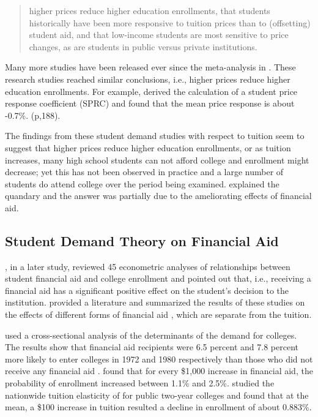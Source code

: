 \documentclass[12pt,english]{report}
\begin{document}
\blockquote{higher prices reduce higher education enrollments, that students historically have been more responsive to tuition prices than to (offsetting) student aid, and that low-income students are most sensitive to price changes, as are students in public versus private institutions.}

Many more studies have been released ever since the meta-analysis in \citep{Leslie1987}. These research 
studies reached similar conclusions, i.e., higher prices reduce higher education enrollments.  For example, \citet{Leslie1987} derived the calculation of a student price response coefficient (SPRC) and 
found that the mean price response is about -0.7\%.   (p,188).

The findings from these student demand studies with respect to tuition seem to suggest that higher prices reduce higher education enrollments, or as tuition increases, many high school students can not afford college and enrollment might decrease; yet this has not been observed in practice and a large number of students do attend college over the period being examined. \citet{Leslie1987} explained the quandary and the answer was partially due to the ameliorating effects of financial aid. 

\subsection{Student Demand Theory on Financial Aid}
\citet{Leslie1988}, in a later study, reviewed 45 econometric analyses of relationships 
between student financial aid and college enrollment and pointed out that, i.e., receiving a financial aid has a significant positive effect on the student's decision to the institution.  \citet{Heller1997} provided a literature and summarized the results of these studies on the effects of different forms of financial aid , which are separate from the tuition. 

\citet{JACKSON198815} used a cross-sectional analysis of the determinants of the demand for colleges.  The results show that financial aid recipients were 6.5 percent and 7.8 percent more likely to enter colleges in 1972 and 1980 respectively than those who did not receive any financial aid . \citet{Braunstein1999} found that for every \$1,000 increase in financial aid, the probability of enrollment increased between 1.1\% and 2.5\%. \citet{Crouse2015} studied the nationwide tuition elasticity of for public two-year colleges and found that at the mean, a \$100 increase in tuition resulted a decline in enrollment of about 0.883\%.
\end{document}
